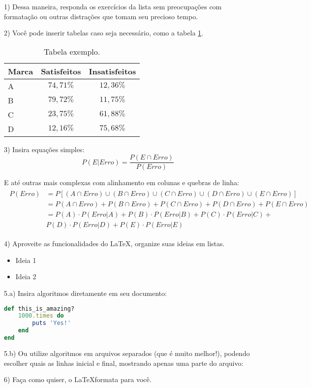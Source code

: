 \documentclass[12pt,a4paper,oneside]{abntex2}
\begin{document}
	\textual
	\pagestyle{cabidaluno} %

1) Dessa maneira, responda os exercícios da lista sem preocupações com formatação ou outras distrações que tomam seu precioso tempo.

2) Você pode inserir tabelas caso seja necessário, como a tabela \ref{tab:exemplo}.

\begin{table}[htb]
	\center
	\caption{Tabela exemplo.}
	\label{tab:exemplo}
	\begin{tabular}{|l|c|c|}
		\hline
		\textbf{Marca} & \textbf{Satisfeitos} & \textbf{Insatisfeitos} \\ \hline
		A & $74,71\%$ & $12,36\%$ \\ \hline
		B & $79,72\%$ & $11,75\%$ \\ \hline
		C & $23,75\%$ & $61,88\%$ \\ \hline
		D & $12,16\%$ & $75,68\%$ \\ \hline
	\end{tabular}
\end{table}

3) Insira equações simples:
\[
	P(E|Erro) = \frac{P(E \cap Erro)}{P(Erro)}
\]

E até outras mais complexas com alinhamento em colunas e quebras de linha:
\begin{align*}
	\begin{split}
		P(Erro) &= P[(A \cap Erro) \cup (B \cap Erro) \cup (C \cap Erro) \cup (D \cap Erro) \cup (E \cap Erro)] \\
		& = P(A \cap Erro) + P(B \cap Erro) + P(C \cap Erro) + P(D \cap Erro) + P(E \cap Erro) \\
		& = P(A) \cdot P(Erro|A) + P(B) \cdot P(Erro|B) + P(C) \cdot P(Erro|C) + \\
		& P(D) \cdot P(Erro|D) + P(E) \cdot P(Erro|E)
	\end{split}
\end{align*}

4) Aproveite as funcionalidades do \LaTeX, organize suas ideias em listas.
\begin{itemize}
	\item Ideia 1
	\item Ideia 2
\end{itemize}

5.a) Insira algoritmos diretamente em seu documento:
\begin{lstlisting}[language = Ruby, caption = Algoritmo inline]
def this_is_amazing?
	1000.times do
		puts 'Yes!'
	end
end
\end{lstlisting}

5.b) Ou utilize algoritmos em arquivos separados (que é muito melhor!), podendo escolher quais as linhas inicial e final, mostrando apenas uma parte do arquivo:


6) Faça como quiser, o \LaTeX formata para você.
\end{document}
